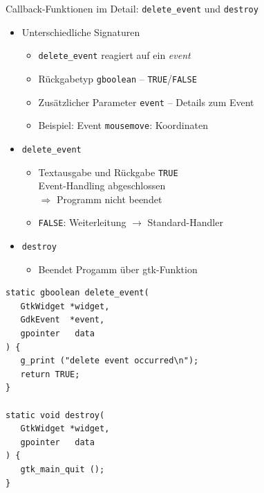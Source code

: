 
\begin{frame}[fragile]{Callback-Funktionen im Detail: \texttt{delete\_event} und \texttt{destroy}}
%
\begin{minipage}{.5\linewidth}
\begin{itemize}
\item Unterschiedliche Signaturen
	\begin{itemize}
	\item \texttt{delete\_event} reagiert auf ein \emph{event}
	\item Rückgabetyp \texttt{gboolean} -- \texttt{TRUE}/\texttt{FALSE}
	\item Zusätzlicher Parameter \texttt{event} -- Details zum Event
	\item Beispiel: Event \texttt{mousemove}: Koordinaten
	\end{itemize}
\item \texttt{delete\_event}
	\begin{itemize}
	\item Textausgabe und Rückgabe \texttt{TRUE}\\
		Event-Handling abgeschlossen \\
		$\Rightarrow$ Programm nicht beendet
	\item \texttt{FALSE}: Weiterleitung $\rightarrow$ Standard-Handler
	\end{itemize}
\item \texttt{destroy}
	\begin{itemize}
	\item Beendet Progamm über gtk-Funktion
	\end{itemize}
\end{itemize}
\end{minipage}
%
\begin{minipage}{.49\linewidth}
\begin{codebox}
\begin{verbatim}
static gboolean delete_event( 
   GtkWidget *widget,
   GdkEvent  *event,
   gpointer   data
) {
   g_print ("delete event occurred\n");
   return TRUE;
}

static void destroy( 
   GtkWidget *widget,
   gpointer   data 
) {
   gtk_main_quit ();
}
\end{verbatim}
\end{codebox}
\end{minipage}
%
\end{frame}